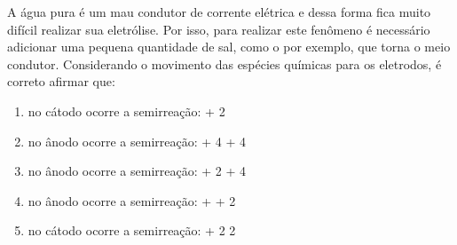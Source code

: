  A água pura é um mau condutor de corrente elétrica e dessa forma fica muito difícil realizar sua eletrólise. Por isso, para realizar este fenômeno é necessário adicionar uma pequena quantidade de sal, como o  por exemplo, que torna o meio condutor. Considerando o movimento das espécies químicas para os eletrodos, é correto afirmar que:

\begin{enumerate}[label = (\alph*)]	
	\item no cátodo ocorre a semirreação:
		 + 2 \arrow{->} 
		\schemestop
	\item no ânodo ocorre a semirreação:
		 \arrow{->}  + 4 + 4
		\schemestop
	\item no ânodo ocorre a semirreação:
		 \arrow{->}  + 2 + 4
		\schemestop
	\item no ânodo ocorre a semirreação:
		 +  \arrow{->}  + 2
		\schemestop
	\item no cátodo ocorre a semirreação:
		 + 2 \arrow{->} 2
		\schemestop
\end{enumerate}
